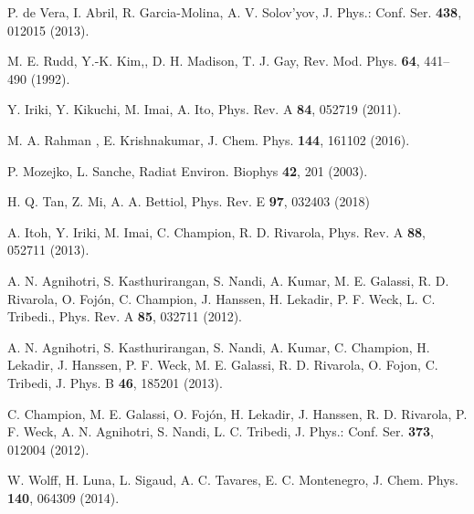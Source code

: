 \begin{thebibliography}{9}
P. de Vera, I. Abril, R. Garcia-Molina, A. V. Solov'yov,
J. Phys.: Conf. Ser. \textbf{438}, 012015 (2013).

M. E. Rudd, Y.-K. Kim,, D. H. Madison, T. J. Gay,
Rev. Mod. Phys. \textbf{64}, 441--490 (1992).

Y. Iriki, Y. Kikuchi, M. Imai, A. Ito,
Phys. Rev. A \textbf{84}, 052719 (2011).

M. A. Rahman , E. Krishnakumar,
J. Chem. Phys. \textbf{144}, 161102 (2016).

P. Mozejko, L. Sanche, 
Radiat Environ. Biophys \textbf{42}, 201 (2003).

H. Q. Tan, Z. Mi, A. A. Bettiol, 
Phys. Rev. E \textbf{97}, 032403 (2018)

A. Itoh, Y. Iriki, M. Imai, C. Champion, R. D. Rivarola, 
Phys. Rev. A \textbf{88}, 052711 (2013).

A. N. Agnihotri, S. Kasthurirangan, S. Nandi, A.
Kumar, M. E. Galassi, R. D. Rivarola, O. Foj\'{o}n, C. Champion, J. Hanssen,
H. Lekadir, P. F. Weck, L. C. Tribedi.,
Phys. Rev. A \textbf{85}, 032711 (2012).

A. N. Agnihotri, S. Kasthurirangan, S. Nandi, A. Kumar, C. Champion, 
H. Lekadir, J. Hanssen, P. F. Weck, M. E. Galassi, R. D. Rivarola, 
O. Fojon, C. Tribedi, 
J. Phys. B \textbf{46}, 185201 (2013).

C. Champion, M. E. Galassi, O. Foj\'{o}n, H. Lekadir, J. Hanssen, 
R. D. Rivarola, P. F. Weck, A. N. Agnihotri, S. Nandi, L. C. Tribedi,
J. Phys.: Conf. Ser. \textbf{373}, 012004 (2012).

W. Wolff, H. Luna, L. Sigaud, A. C. Tavares, E. C. Montenegro,
J. Chem. Phys. \textbf{140}, 064309 (2014).


\end{thebibliography}
